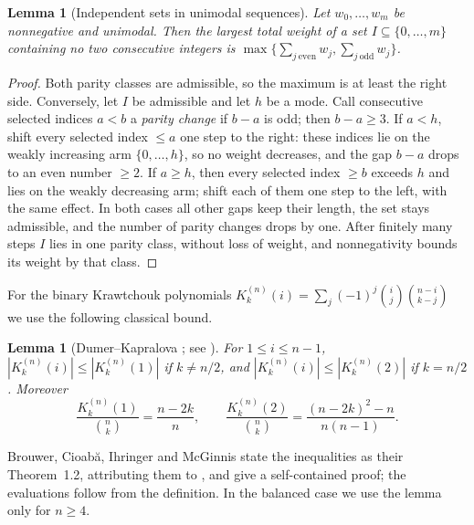 \documentclass[11pt]{article}
\newtheorem{lemma}[theorem]{Lemma}
\theoremstyle{remark}
\begin{document}
\begin{lemma}[Independent sets in unimodal sequences]\label{lem:unimodal-parity}
Let \(w_0,\ldots,w_m\) be nonnegative and unimodal. Then the largest total
weight of a set \(I\subseteq\{0,\ldots,m\}\) containing no two consecutive
integers is \(\max\{\sum_{j\ \mathrm{even}}w_j,\sum_{j\ \mathrm{odd}}w_j\}\).
\end{lemma}
\begin{proof}
Both parity classes are admissible, so the maximum is at least the right side.
Conversely, let \(I\) be admissible and let \(h\) be a mode. Call consecutive
selected indices \(a<b\) a \emph{parity change} if \(b-a\) is odd; then
\(b-a\ge3\). If \(a<h\), shift every selected index \(\le a\) one step to the
right: these indices lie on the weakly increasing arm \(\{0,\ldots,h\}\), so
no weight decreases, and the gap \(b-a\) drops to an even number \(\ge2\). If
\(a\ge h\), then every selected index \(\ge b\) exceeds \(h\) and lies on the
weakly decreasing arm; shift each of them one step to the left, with the same
effect. In both cases all other gaps keep their length, the set stays
admissible, and the number of parity changes drops by one. After finitely many
steps \(I\) lies in one parity class, without loss of weight, and
nonnegativity bounds its weight by that class.
\end{proof}

For the binary Krawtchouk polynomials
\(K_k^{(n)}(i)=\sum_j(-1)^j\binom ij\binom{n-i}{k-j}\) we use the following
classical bound.

\begin{lemma}[{Dumer--Kapralova \cite{DK}; see \cite[Theorem~1.2]{BCIM}}]\label{lem:known-krawtchouk}
For \(1\le i\le n-1\),
\(|K_k^{(n)}(i)|\le|K_k^{(n)}(1)|\) if \(k\ne n/2\), and
\(|K_k^{(n)}(i)|\le|K_k^{(n)}(2)|\) if \(k=n/2\). Moreover
\[
 \frac{K_k^{(n)}(1)}{\binom nk}=\frac{n-2k}{n},\qquad
 \frac{K_k^{(n)}(2)}{\binom nk}=\frac{(n-2k)^2-n}{n(n-1)} .
\]
\end{lemma}
Brouwer, Cioab\u{a}, Ihringer and McGinnis state the inequalities as their
Theorem~1.2, attributing them to \cite[Corollary~10]{DK}, and give a
self-contained proof; the evaluations follow from the definition. In the
balanced case we use the lemma only for \(n\ge4\).
\end{document}
